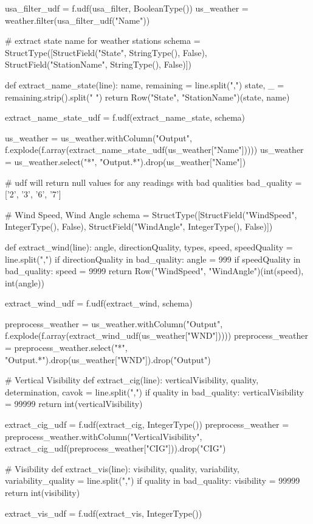 \documentclass[11pt]{article}
\begin{document}
usa_filter_udf = f.udf(usa_filter, BooleanType())
us_weather = weather.filter(usa_filter_udf("Name"))

# extract state name for weather stations
schema = StructType([StructField("State", StringType(), False), StructField("StationName", StringType(), False)])

def extract_name_state(line):
  name, remaining = line.split(",")
  state, _ = remaining.strip().split(" ")
  return Row("State", "StationName")(state, name)

extract_name_state_udf = f.udf(extract_name_state, schema)

us_weather = us_weather.withColumn("Output", f.explode(f.array(extract_name_state_udf(us_weather["Name"]))))
us_weather = us_weather.select("*", "Output.*").drop(us_weather["Name"])

# udf will return null values for any readings with bad qualities
bad_quality = ['2', '3', '6', '7']

# Wind Speed, Wind Angle
schema = StructType([StructField("WindSpeed", IntegerType(), False),
                     StructField("WindAngle", IntegerType(), False)])

def extract_wind(line):
    angle, directionQuality, types, speed, speedQuality = line.split(",")
    if directionQuality in bad_quality:
        angle = 999
    if speedQuality in bad_quality:
        speed = 9999
    return Row("WindSpeed", "WindAngle")(int(speed), int(angle))

extract_wind_udf = f.udf(extract_wind, schema)

preprocess_weather = us_weather.withColumn("Output", f.explode(f.array(extract_wind_udf(us_weather["WND"]))))
preprocess_weather = preprocess_weather.select("*", "Output.*").drop(us_weather["WND"]).drop("Output")

# Vertical Visibility
def extract_cig(line):
  verticalVisibility, quality, determination, cavok = line.split(",")
  if quality in bad_quality:
      verticalVisibility = 99999
  return int(verticalVisibility)

extract_cig_udf = f.udf(extract_cig, IntegerType())
preprocess_weather = preprocess_weather.withColumn("VerticalVisibility", extract_cig_udf(preprocess_weather["CIG"])).drop("CIG")

# Visibility
def extract_vis(line):
  visibility, quality, variability, variability_quality = line.split(",")
  if quality in bad_quality:
      visibility = 99999
  return int(visibility)

extract_vis_udf = f.udf(extract_vis, IntegerType())
\end{document}
